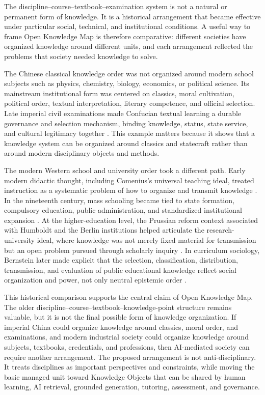 \documentclass[11pt,letterpaper]{article}
\newcommand{\OKM}{Open Knowledge Map}
\begin{document}
The discipline--course--textbook--examination system is not a natural or permanent form of knowledge. It is a historical arrangement that became effective under particular social, technical, and institutional conditions. A useful way to frame \OKM{} is therefore comparative: different societies have organized knowledge around different units, and each arrangement reflected the problems that society needed knowledge to solve.

The Chinese classical knowledge order was not organized around modern school subjects such as physics, chemistry, biology, economics, or political science. Its mainstream institutional form was centered on classics, moral cultivation, political order, textual interpretation, literary competence, and official selection. Late imperial civil examinations made Confucian textual learning a durable governance and selection mechanism, binding knowledge, status, state service, and cultural legitimacy together \cite{elman-civil-examinations}. This example matters because it shows that a knowledge system can be organized around classics and statecraft rather than around modern disciplinary objects and methods.

The modern Western school and university order took a different path. Early modern didactic thought, including Comenius's universal teaching ideal, treated instruction as a systematic problem of how to organize and transmit knowledge \cite{comenius-great-didactic}. In the nineteenth century, mass schooling became tied to state formation, compulsory education, public administration, and standardized institutional expansion \cite{soysal-strang-mass-education}. At the higher-education level, the Prussian reform context associated with Humboldt and the Berlin institutions helped articulate the research-university ideal, where knowledge was not merely fixed material for transmission but an open problem pursued through scholarly inquiry \cite{humboldt-higher-institutions}. In curriculum sociology, Bernstein later made explicit that the selection, classification, distribution, transmission, and evaluation of public educational knowledge reflect social organization and power, not only neutral epistemic order \cite{bernstein-classification}.

This historical comparison supports the central claim of \OKM{}. The older discipline--course--textbook--knowledge-point structure remains valuable, but it is not the final possible form of knowledge organization. If imperial China could organize knowledge around classics, moral order, and examinations, and modern industrial society could organize knowledge around subjects, textbooks, credentials, and professions, then AI-mediated society can require another arrangement. The proposed arrangement is not anti-disciplinary. It treats disciplines as important perspectives and constraints, while moving the basic managed unit toward Knowledge Objects that can be shared by human learning, AI retrieval, grounded generation, tutoring, assessment, and governance.
\end{document}
